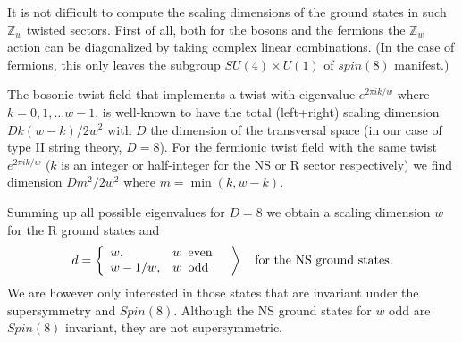 \documentclass[nohyper,12pt,letterpaper]{JHEP3}
\def\IZ{{\mathbb Z}}           %
\def \eqn#1#2{\begin{equation}#2\label{#1}\end{equation}}
\begin{document}
It is not difficult to compute the scaling dimensions of the ground states 
in such $\IZ_w$ twisted sectors. First of all, both for the bosons and the 
fermions the $\IZ_w$ action can be diagonalized by taking complex linear 
combinations. (In the case of fermions, this only leaves the subgroup
$SU(4)\times U(1)$ of $spin(8)$ manifest.)

The bosonic twist field that implements a twist with eigenvalue
$e^{2\pi i k/w}$ where $k=0,1,\dots w-1$, is well-known to have the
total (left+right) scaling dimension $Dk(w-k)/2w^2$ with $D$ the
dimension of the transversal space (in our case of type II string
theory, $D=8$). For the fermionic twist field with the same twist
$e^{2\pi i k/w}$ ($k$ is an integer or half-integer for the NS or R
sector respectively) we find dimension $Dm^2/2w^2$ where
$m=\min(k,w-k)$.

Summing up all possible eigenvalues for $D=8$ we obtain a scaling 
dimension $w$ for the R ground states and
%
\eqn{addingup}{
d=\left\{\begin{array}{ll}
w,&w \mbox{\,\,\,even}\\
w-1/w,&w \mbox{\,\,\,odd}
\end{array}\quad
\right\rangle\quad\mbox{for the NS ground states.}
}
%
We are however only interested in those states that are  invariant under 
the supersymmetry and $Spin(8)$. Although the NS ground states for $w$ odd 
are $Spin(8)$ invariant, they are not supersymmetric.
\end{document}
